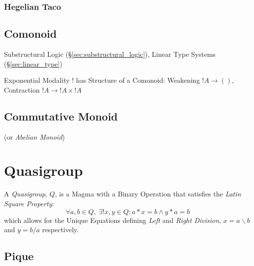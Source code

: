 \subsubsection{Hegelian Taco}\label{sec:hegelian_taco}



\subsection{Comonoid}\label{sec:comonoid}

Substructural Logic (\S\ref{sec:substructural_logic}), Linear Type
Systems (\S\ref{sec:linear_type})

Exponential Modality $!$ has Structure of a Comonoid: Weakening $!A
\rightarrow ()$, Contraction $!A \rightarrow !A \times !A$



\subsection{Commutative Monoid}\label{sec:commutative_monoid}

(or \emph{Abelian Monoid})



\section{Quasigroup}\label{sec:quasigroup}

A \emph{Quasigroup}, $Q$, is a Magma with a Binary Operation that satisfies
the \emph{Latin Square Property}:
\[
  \forall a, b \in Q,\;\exists ! x,y \in Q : a * x = b \wedge y * a = b
\]
which allows for the Unique Equations defining \emph{Left} and
\emph{Right Division}, $x = a \backslash b$ and $y = b / a$
respectively.



\subsection{Pique}\label{sec:pique}

